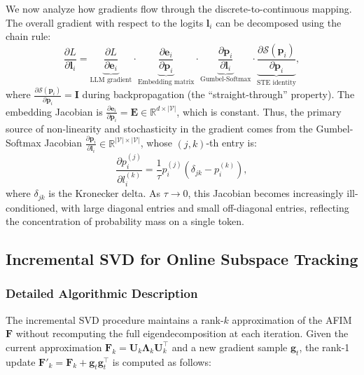 \documentclass[preprint,12pt]{elsarticle}
\begin{document}
We now analyze how gradients flow through the discrete-to-continuous mapping. The overall gradient with respect to the logits $\mathbf{l}_i$ can be decomposed using the chain rule:
\begin{equation}
\label{eq:chain_rule}
\frac{\partial L}{\partial \mathbf{l}_i} = \underbrace{\frac{\partial L}{\partial \mathbf{e}_i}}_{\text{LLM gradient}} \cdot \underbrace{\frac{\partial \mathbf{e}_i}{\partial \mathbf{p}_i}}_{\text{Embedding matrix}} \cdot \underbrace{\frac{\partial \mathbf{p}_i}{\partial \mathbf{l}_i}}_{\text{Gumbel-Softmax}} \cdot \underbrace{\frac{\partial \mathcal{S}(\mathbf{p}_i)}{\partial \mathbf{p}_i}}_{\text{STE identity}},
\end{equation}
where $\frac{\partial \mathcal{S}(\mathbf{p}_i)}{\partial \mathbf{p}_i} = \mathbf{I}$ during backpropagation (the ``straight-through'' property). The embedding Jacobian is $\frac{\partial \mathbf{e}_i}{\partial \mathbf{p}_i} = \mathbf{E} \in \mathbb{R}^{d \times |\mathcal{V}|}$, which is constant. Thus, the primary source of non-linearity and stochasticity in the gradient comes from the Gumbel-Softmax Jacobian $\frac{\partial \mathbf{p}_i}{\partial \mathbf{l}_i} \in \mathbb{R}^{|\mathcal{V}| \times |\mathcal{V}|}$, whose $(j, k)$-th entry is:
\begin{equation}
\label{eq:softmax_jacobian}
\frac{\partial p_i^{(j)}}{\partial l_i^{(k)}} = \frac{1}{\tau} p_i^{(j)} \left(\delta_{jk} - p_i^{(k)}\right),
\end{equation}
where $\delta_{jk}$ is the Kronecker delta. As $\tau \to 0$, this Jacobian becomes increasingly ill-conditioned, with large diagonal entries and small off-diagonal entries, reflecting the concentration of probability mass on a single token.

\subsection{Incremental SVD for Online Subspace Tracking}
\label{sec:incremental_svd}

\subsubsection{Detailed Algorithmic Description}
\label{sec:incsvd_detail}

The incremental SVD procedure maintains a rank-$k$ approximation of the AFIM $\mathbf{F}$ without recomputing the full eigendecomposition at each iteration. Given the current approximation $\mathbf{F}_k = \mathbf{U}_k \boldsymbol{\Lambda}_k \mathbf{U}_k^\top$ and a new gradient sample $\mathbf{g}_t$, the rank-1 update $\mathbf{F}'_k = \mathbf{F}_k + \mathbf{g}_t \mathbf{g}_t^\top$ is computed as follows:
\end{document}
